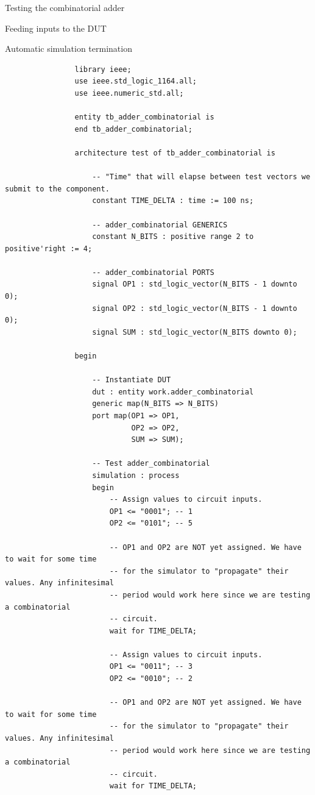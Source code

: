 \documentclass[a4paper, 12pt, onecolumn]{article}
\begin{document}
\begin{section}{Testing the combinatorial adder}
\begin{subsection}{Feeding inputs to the DUT}
\begin{subsubsection}{Automatic simulation termination}
            \begin{verbatim}
                library ieee;
                use ieee.std_logic_1164.all;
                use ieee.numeric_std.all;

                entity tb_adder_combinatorial is
                end tb_adder_combinatorial;

                architecture test of tb_adder_combinatorial is

                    -- "Time" that will elapse between test vectors we submit to the component.
                    constant TIME_DELTA : time := 100 ns;

                    -- adder_combinatorial GENERICS
                    constant N_BITS : positive range 2 to positive'right := 4;

                    -- adder_combinatorial PORTS
                    signal OP1 : std_logic_vector(N_BITS - 1 downto 0);
                    signal OP2 : std_logic_vector(N_BITS - 1 downto 0);
                    signal SUM : std_logic_vector(N_BITS downto 0);

                begin

                    -- Instantiate DUT
                    dut : entity work.adder_combinatorial
                    generic map(N_BITS => N_BITS)
                    port map(OP1 => OP1,
                             OP2 => OP2,
                             SUM => SUM);

                    -- Test adder_combinatorial
                    simulation : process
                    begin
                        -- Assign values to circuit inputs.
                        OP1 <= "0001"; -- 1
                        OP2 <= "0101"; -- 5

                        -- OP1 and OP2 are NOT yet assigned. We have to wait for some time
                        -- for the simulator to "propagate" their values. Any infinitesimal
                        -- period would work here since we are testing a combinatorial
                        -- circuit.
                        wait for TIME_DELTA;

                        -- Assign values to circuit inputs.
                        OP1 <= "0011"; -- 3
                        OP2 <= "0010"; -- 2

                        -- OP1 and OP2 are NOT yet assigned. We have to wait for some time
                        -- for the simulator to "propagate" their values. Any infinitesimal
                        -- period would work here since we are testing a combinatorial
                        -- circuit.
                        wait for TIME_DELTA;


\end{verbatim}
\end{subsubsection}
\end{subsection}
\end{section}
\end{document}
